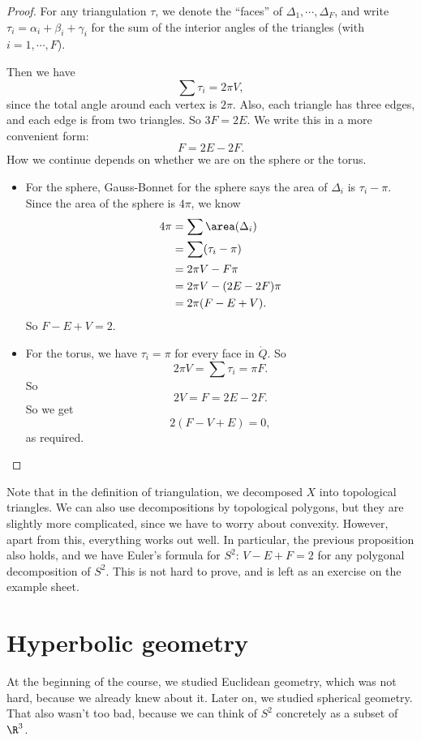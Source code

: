\documentclass[a4paper]{article}
\begin{document}
\begin{proof}
  For any triangulation $\tau$, we denote the ``faces'' of $\Delta_1, \cdots, \Delta_F$, and write $\tau_i = \alpha_i + \beta_i + \gamma_i$ for the sum of the interior angles of the triangles (with $i = 1, \cdots, F$).

  Then we have
  \[
    \sum \tau_i = 2 \pi V,
  \]
  since the total angle around each vertex is $2\pi$. Also, each triangle has three edges, and each edge is from two triangles. So $3F = 2E$. We write this in a more convenient form:
  \[
    F = 2E - 2F.
  \]
  How we continue depends on whether we are on the sphere or the torus.
  \begin{itemize}
    \item For the sphere, Gauss-Bonnet for the sphere says the area of $\Delta_i$ is $\tau_i - \pi$. Since the area of the sphere is $4\pi$, we know
      \begin{align*}
        4\pi &= \sum \area(\Delta_i) \\
        &= \sum (\tau_i - \pi) \\
        &= 2\pi V - F\pi \\
        &= 2\pi V - (2E - 2F)\pi \\
        &= 2\pi (F - E + V).
      \end{align*}
      So $F - E + V = 2$.
    \item For the torus, we have $\tau_i = \pi$ for every face in $\mathring{Q}$. So
      \[
        2\pi V = \sum \tau_i = \pi F.
      \]
      So
      \[
        2V = F = 2E - 2F.
      \]
      So we get
      \[
        2(F - V + E) = 0,
      \]
      as required.\qedhere
  \end{itemize}
\end{proof}
Note that in the definition of triangulation, we decomposed $X$ into topological triangles. We can also use decompositions by topological polygons, but they are slightly more complicated, since we have to worry about convexity. However, apart from this, everything works out well. In particular, the previous proposition also holds, and we have Euler's formula for $S^2$: $V - E + F = 2$ for any polygonal decomposition of $S^2$. This is not hard to prove, and is left as an exercise on the example sheet.

\section{Hyperbolic geometry}
At the beginning of the course, we studied Euclidean geometry, which was not hard, because we already knew about it. Later on, we studied spherical geometry. That also wasn't too bad, because we can think of $S^2$ concretely as a subset of $\R^3$.
\end{document}
